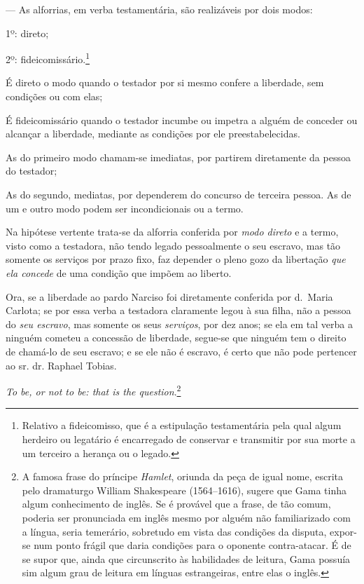 {--- As alforrias, em verba testamentária, são realizáveis por dois
modos:

1º: direto;

2º: fideicomissário.\footnote{ Relativo a
  fideicomisso, que é a estipulação testamentária pela qual algum
  herdeiro ou legatário é encarregado de conservar e transmitir por sua
  morte a um terceiro a herança ou o legado.}

É direto o modo quando o testador por si mesmo confere a liberdade, sem
condições ou com elas;

É fideicomissário quando o testador incumbe ou impetra a alguém de
conceder ou alcançar a liberdade, mediante as condições por ele
preestabelecidas.

As do primeiro modo chamam-se imediatas, por partirem diretamente da
pessoa do testador;

As do segundo, mediatas, por dependerem do concurso de terceira pessoa.
As de um e outro modo podem ser incondicionais ou a termo.

Na hipótese vertente trata-se da alforria conferida por \emph{modo
direto} e a termo, visto como a testadora, não tendo legado pessoalmente
o seu escravo, mas tão somente os serviços por prazo fixo, faz depender
o pleno gozo da libertação \emph{que ela concede} de uma condição que
impõem ao liberto.

Ora, se a liberdade ao pardo Narciso foi diretamente conferida por
d.~Maria Carlota; se por essa verba a testadora claramente legou à sua
filha, não a pessoa do \emph{seu escravo}, mas somente os seus
\emph{serviços}, por dez anos; se ela em tal verba a ninguém cometeu a
concessão de liberdade, segue-se que ninguém tem o direito de chamá-lo
de seu escravo; e se ele não é escravo, é certo que não pode pertencer
ao sr. dr. Raphael Tobias.

\emph{To be, or not to be: that is the question}.\footnote{ A famosa
  frase do príncipe \emph{Hamlet}, oriunda da peça de igual nome,
  escrita pelo dramaturgo William Shakespeare (1564--1616), sugere que
  Gama tinha algum conhecimento de inglês. Se é provável que a frase, de
  tão comum, poderia ser pronunciada em inglês mesmo por alguém não
  familiarizado com a língua, seria temerário, sobretudo em vista das
  condições da disputa, expor-se num ponto frágil que daria condições
  para o oponente contra-atacar. É de se supor que, ainda que
  circunscrito às habilidades de leitura, Gama possuía sim algum grau de
  leitura em línguas estrangeiras, entre elas o inglês.}

}
